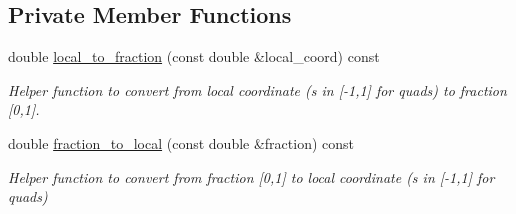 \subsection*{Private Member Functions}
\begin{DoxyCompactItemize}
\item 
double \hyperlink{classoomph_1_1ReflectedIntegral_a80aea32b954d235adaff8889eb69cfcd}{local\+\_\+to\+\_\+fraction} (const double \&local\+\_\+coord) const
\begin{DoxyCompactList}\small\item\em Helper function to convert from local coordinate (s in \mbox{[}-\/1,1\mbox{]} for quads) to fraction \mbox{[}0,1\mbox{]}. \end{DoxyCompactList}\item 
double \hyperlink{classoomph_1_1ReflectedIntegral_ac8500d64678b3477335ef639716f7cbe}{fraction\+\_\+to\+\_\+local} (const double \&fraction) const
\begin{DoxyCompactList}\small\item\em Helper function to convert from fraction \mbox{[}0,1\mbox{]} to local coordinate (s in \mbox{[}-\/1,1\mbox{]} for quads) \end{DoxyCompactList}\end{DoxyCompactItemize}
